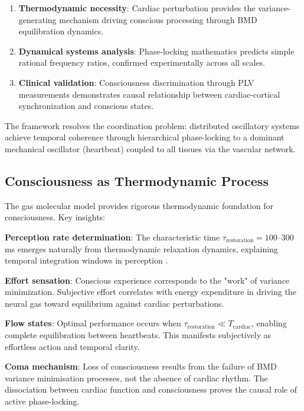 \documentclass[12pt]{article}
\theoremstyle{remark}
\begin{document}
\begin{enumerate}
\item \textbf{Thermodynamic necessity}: Cardiac perturbation provides the variance-generating mechanism driving conscious processing through BMD equilibration dynamics.

\item \textbf{Dynamical systems analysis}: Phase-locking mathematics predicts simple rational frequency ratios, confirmed experimentally across all scales.

\item \textbf{Clinical validation}: Consciousness discrimination through PLV measurements demonstrates causal relationship between cardiac-cortical synchronization and conscious states.
\end{enumerate}

The framework resolves the coordination problem: distributed oscillatory systems achieve temporal coherence through hierarchical phase-locking to a dominant mechanical oscillator (heartbeat) coupled to all tissues via the vascular network.

\subsection{Consciousness as Thermodynamic Process}

The gas molecular model provides rigorous thermodynamic foundation for consciousness. Key insights:

\textbf{Perception rate determination}: The characteristic time $\tau_{\text{restoration}} = 100$--$300$ ms emerges naturally from thermodynamic relaxation dynamics, explaining temporal integration windows in perception \citep{vanzijl2004temporal}.

\textbf{Effort sensation}: Conscious experience corresponds to the "work" of variance minimization. Subjective effort correlates with energy expenditure in driving the neural gas toward equilibrium against cardiac perturbations.

\textbf{Flow states}: Optimal performance occurs when $\tau_{\text{restoration}} \ll T_{\text{cardiac}}$, enabling complete equilibration between heartbeats. This manifests subjectively as effortless action and temporal clarity.

\textbf{Coma mechanism}: Loss of consciousness results from the failure of BMD variance minimisation processes, not the absence of cardiac rhythm. The dissociation between cardiac function and consciousness proves the causal role of active phase-locking.
\end{document}
